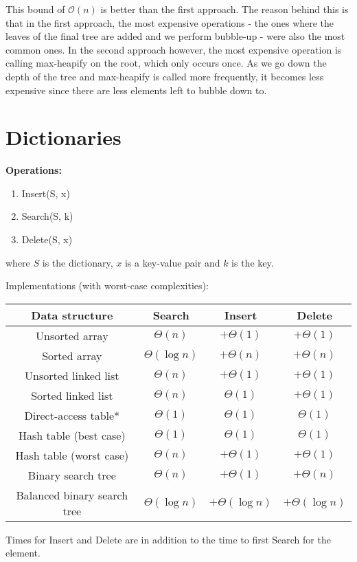 \documentclass[11pt]{article}
\begin{document}
This bound of $\mathcal{O}(n)$ is better than the first approach. The reason behind this is that in the first approach, the most expensive operations - the ones where the leaves of the final tree are added and we perform bubble-up - were also the most common ones. In the second approach however, the most expensive operation is calling max-heapify on the root, which only occurs once. As we go down the depth of the tree and max-heapify is called more frequently, it becomes less expensive since there are less elements left to bubble down to. 

\newpage 
\section{Dictionaries}
\textbf{Operations:}
\begin{enumerate}
    \item Insert(S, x)
    \item Search(S, k)
    \item Delete(S, x)
\end{enumerate}
where $S$ is the dictionary, $x$ is a key-value pair and $k$ is the key. 

Implementations (with worst-case complexities): 
\begin{center}
\begin{tabular}{|c|c|c|c|}
\hline
    Data structure & Search & Insert & Delete \\ \hline
    Unsorted array & $\Theta(n)$ & $+\Theta(1)$ & $+ \Theta(1)$ \\ 
    \hline Sorted array & $\Theta(\log n)$ & $+\Theta(n)$ & $+ \Theta(n)$ \\
    \hline Unsorted linked list & $\Theta(n)$ & $+\Theta(1)$ & $+\Theta(1)$ \\
    \hline Sorted linked list & $\Theta(n)$ & $\Theta(1)$ & $+ \Theta(1)$\\
    \hline Direct-access table* & $\Theta(1)$ & $\Theta(1)$ & $\Theta(1)$ \\ 
    \hline Hash table (best case) & $\Theta(1)$ & $\Theta(1)$&$\Theta(1)$ \\
    \hline Hash table (worst case) & $\Theta(n)$ & $+\Theta(1)$ & $+\Theta(1)$ \\
    \hline Binary search tree & $\Theta(n)$ & $+\Theta(1)$ & $+\Theta(n)$ \\
    \hline Balanced binary search tree & $\Theta(\log n)$ & $+\Theta(\log n)$ & $+\Theta(\log n)$ \\
    \hline
\end{tabular}
\end{center}
Times for Insert and Delete are in addition to the time to first Search for the element. 
\end{document}
